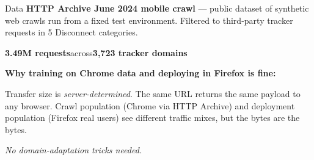 \documentclass[10pt,aspectratio=169]{beamer}
\begin{document}
\begin{frame}{Data}
    \textbf{HTTP Archive June 2024 mobile crawl} — public dataset of synthetic web crawls run from a fixed test environment. Filtered to third-party tracker requests in 5 Disconnect categories.

    \vspace{0.8em}
    \begin{center}
        \Large \textbf{3.49M requests}\quad across\quad \textbf{3,723 tracker domains}
    \end{center}

    \vspace{0.8em}
    \textbf{Why training on Chrome data and deploying in Firefox is fine:}

    Transfer size is \textit{server-determined}. The same URL returns the same payload to any browser. Crawl population (Chrome via HTTP Archive) and deployment population (Firefox real users) see different traffic mixes, but the bytes are the bytes.

    \vspace{0.4em}
    \small
    \textit{No domain-adaptation tricks needed.}
\end{frame}
\end{document}
